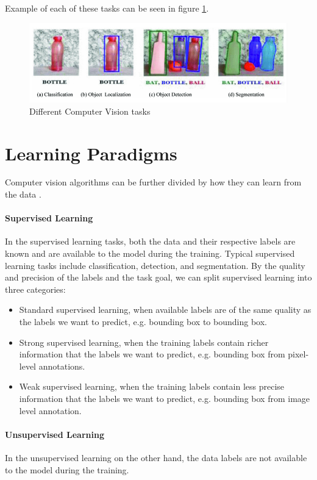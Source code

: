 Example of each of these tasks can be seen in figure \ref{fig:aiml-tasks}.

\begin{figure}[H]
\begin{centering}
\includegraphics[width=12cm]{assets/images/aiml-tasks.png}
\par\end{centering}
\caption{Different Computer Vision tasks \cite{Alam2021}}
\label{fig:aiml-tasks}
\end{figure}


\section{Learning Paradigms}
Computer vision algorithms can be further divided by how they can learn from the data \cite{Alam2021}.

\paragraph{Supervised Learning} In the supervised learning tasks, both the data and their respective labels are known and are available to the model during the training. Typical supervised learning tasks include classification, detection, and segmentation. By the quality and precision of the labels and the task goal, we can split supervised learning into three categories:

\begin{itemize}
    \item Standard supervised learning, when available labels are of the same quality as the labels we want to predict, e.g. bounding box to bounding box.
    \item Strong supervised learning, when the training labels contain richer information that the labels we want to predict, e.g. bounding box from pixel-level annotations.
    \item Weak supervised learning, when the training labels contain less precise information that the labels we want to predict, e.g. bounding box from image level annotation.
\end{itemize}

\paragraph{Unsupervised Learning} In the unsupervised learning on the other hand, the data labels are not available to the model during the training.

